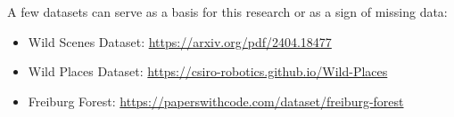 \documentclass[runningheads]{llncs}
\begin{document}
A few datasets can serve as a basis for this research or as a sign of missing data:
\begin{itemize}
  \item Wild Scenes Dataset: \url{https://arxiv.org/pdf/2404.18477}
  \item Wild Places Dataset: \url{https://csiro-robotics.github.io/Wild-Places}
  \item Freiburg Forest: \url{https://paperswithcode.com/dataset/freiburg-forest}
\end{itemize}


\printbibliography
\end{document}
